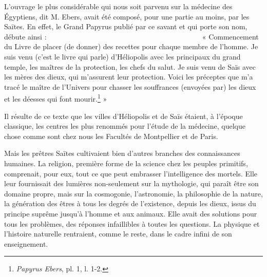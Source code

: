 \documentclass[a4paper, 11pt, oneside]{article}
\newcommand*\hieroAAAD{}
\newcommand*\hieroAAAG{}
\newcommand*\hieroAAAH{}
\newcommand*\hieroAAAQ{}
\newcommand*\hieroAAAU{}
\newcommand*\hieroAAAW{\raisebox{0.5ex}{}}
\newcommand*\hieroAABM{}
\newcommand*\hieroAABN{}
\newcommand*\hieroAABR{}
\newcommand*\hieroAACB{\raisebox{0.5ex}{}}
\newcommand*\hieroAACM{}
\newcommand*\hieroAACS{}
\newcommand*\hieroAADB{}
\newcommand*\hieroAADC{\raisebox{0.5ex}{}}
\newcommand*\hieroAADF{}
\newcommand*\hieroAADU{}
\newcommand*\hieroAAEC{}
\newcommand*\hieroAAEF{}
\newcommand*\hieroAAEK{}
\newcommand*\hieroAAEL{}
\newcommand*\hieroAAEP{\raisebox{0.5ex}{}}
\newcommand*\hieroAAEZ{}
\newcommand*\hieroAAFQ{}
\newcommand*\hieroAAFS{}
\newcommand*\hieroAAHT{}
\newcommand*\hieroAAHY{}
\newcommand*\hieroAAJW{}
\newcommand*\hieroAAJX{}
\newcommand*\hieroAAJY{}
\newcommand*\hieroAAJZ{}
\newcommand*\hieroAAKA{}
\newcommand*\hieroAAKB{}
\newcommand*\hieroAAKC{}
\newcommand*\hieroAAKD{}
\newcommand*\hieroAAKE{}
\newcommand*\hieroAAKF{}
\newcommand*\hieroAAKG{}
\newcommand*\hieroAAKH{}
\newcommand*\hieroAAKI{}
\newcommand*\hieroAAKJ{}
\newcommand*\hieroAAKK{\raisebox{0.5ex}{}}
\newcommand*\hieroAAKL{}
\newcommand*\hieroAAKM{}
\newcommand*\hieroAAKN{}
\newcommand*\hieroAAKO{}
\newcommand*\hieroAAKP{}
\newcommand*\hieroAAKQ{}
\newcommand*\hieroAAKR{}
\newcommand*\hieroAAKS{}
\newcommand*\hieroAAKT{}
\newcommand*\hieroAAKU{}
\newcommand*\hieroAAKV{}
\newcommand*\hieroAAKW{}
\newcommand*\hieroAAKX{}
\newcommand*\hieroAAKY{}
\newcommand*\hieroAAKZ{}
\newcommand*\hieroAALA{}
\newcommand*\hieroAALB{}
\newcommand*\hieroAALC{}
\begin{document}
L'ouvrage le plus considérable qui nous soit parvenu sur la médecine des Égyptiens, dit M. Ebers, avait été composé, pour une partie au moins, par les Saïtes. En effet, le Grand Papyrus publié par ce savant et qui porte son nom, débute ainsi : $\hieroAAJW\:\hieroAABR\:\hieroAAJX\allowbreak\:\hieroAAJY\:\hieroAAEZ\:\hieroAAJZ\allowbreak\:\hieroAAKA\:\hieroAAKB\:\hieroAAEC\allowbreak\:\hieroAAKC\:\hieroAAFS\:\hieroAAAQ\allowbreak\:\hieroAAKD\:\hieroAADU\:\hieroAAKE\allowbreak\:\hieroAABR\:\hieroAAEL\:\hieroAAKF\allowbreak\:\hieroAAEZ\:\hieroAAHT\:\hieroAAFQ\allowbreak\:\hieroAADC\:\hieroAADB\:\hieroAAEF\allowbreak\:\hieroAAKG\:\hieroAABN\:\hieroAAAU\allowbreak\:\hieroAADB\:\hieroAAEF\:\hieroAAKH\allowbreak\:\hieroAABR\:\hieroAAKI\:\hieroAAKJ\allowbreak\:\hieroAABM\:\hieroAAKK\:\hieroAADC\allowbreak\:\hieroAADB\:\hieroAAEF\:\hieroAAKL\allowbreak\:\hieroAABR\:\hieroAAKM\:\hieroAADU\allowbreak\:\hieroAAKE\:\hieroAABR\:\hieroAAAD\allowbreak\:\hieroAAAG\:\hieroAADC\:\hieroAAAW\allowbreak\:\hieroAAEZ\:\hieroAAKN\:\hieroAAKO\allowbreak\:\hieroAAKP\:\hieroAADB\:\hieroAAEF\allowbreak\:\hieroAAEK\:\hieroAAEK\:\hieroAAEK\allowbreak\:\hieroAADB\:\hieroAAEF\:\hieroAAKQ\allowbreak\:\hieroAACS\:\hieroAAKR\:\hieroAAKE\allowbreak\:\hieroAABR\:\hieroAAKI\:\hieroAAKJ\allowbreak\:\hieroAAEF\:\hieroAACS\:\hieroAAKR\allowbreak\:\hieroAAAH\:\hieroAACM\:\hieroAAKS\allowbreak\:\hieroAADC\:\hieroAADF\:\hieroAAEF\allowbreak\:\hieroAAKE\:\hieroAAKT\:\hieroAAKU\allowbreak\:\hieroAAKV\:\hieroAADB\:\hieroAAEP\allowbreak\:\hieroAAKW\:\hieroAAHY\:\hieroAAKX\allowbreak\:\hieroAAKY\:\hieroAAEK\:\hieroAADB\allowbreak\:\hieroAAEK\:\hieroAAKZ\:\hieroAALA\allowbreak\:\hieroAALB\:\hieroAALC\allowbreak\:\hieroAALB\:\hieroAALC\:\hieroAACB$ « Commencement du Livre de placer (de donner) des recettes pour chaque membre de l'homme. Je suis venu (c'est le livre qui parle) d'Héliopolis avec les principaux du grand temple, les maîtres de la protection, les chefs du salut. Je suis venu de Saïs avec les mères des dieux, qui m'assurent leur protection. Voici les préceptes que m'a tracé le maître de l'Univers pour chasser les souffrances (envoyées par) les dieux et les déesses qui font mourir.\footnote{\emph{Papyrus Ebers}, pl. 1, l. 1-2.} »

Il résulte de ce texte que les villes d'Héliopolis et de Saïs étaient, à l'époque classique, les centres les plus renommés pour l'étude de la médecine, quelque chose comme sont chez nous les Facultés de Montpellier et de Paris.

Mais les prêtres Saïtes cultivaient bien d'autres branches des connaissances humaines. La religion, première forme de la science chez les peuples primitifs, comprenait, pour eux, tout ce que peut embrasser l'intelligence des mortels. Elle leur fournissait des lumières non-seulement sur la mythologie, qui paraît être son domaine propre, mais sur la cosmogonie, l'astronomie, la philosophie de la nature, la génération des êtres à tous les degrés de l'existence, depuis les dieux, issus du principe suprême jusqu'à l'homme et aux animaux. Elle avait des solutions pour tous les problèmes, des réponses infaillibles à toutes les questions. La physique et l'histoire naturelle rentraient, comme le reste, dans le cadre infini de son enseignement.
\end{document}

